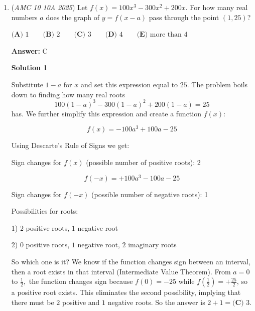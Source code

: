 \begin{enumerate}
 


	\item (\textit{AMC 10 10A 2025}) Let $f(x) = 100x^3 - 300x^2 + 200x$. For how many real numbers $a$ does the graph of $y = f(x - a)$ pass through the point $(1, 25)$?


 $\textbf{(A) }1 \qquad\textbf{(B) }2 \qquad\textbf{(C) }3 \qquad\textbf{(D) }4 \qquad\textbf{(E) }\text{more than }4$

 \textbf{Answer: }C



\textbf{Solution 1}

Substitute $1 - a$ for $x$ and set this expression equal to $25.$ The problem boils down to finding how many real roots  
 \[100(1-a)^3 - 300(1-a)^2 + 200(1-a) = 25\] has. We further simplify this expression and create a function $f(x):$

 \[f(x) = -100a^3 + 100a - 25\] 

 Using Descarte's Rule of Signs we get: 

 Sign changes for $f(x)$ (possible number of positive roots): 2 

 
 \[f(-x) = +100a^3 - 100a - 25\] 

 Sign changes for $f(-x)$ (possible number of negative roots): 1 

 
Possibilities for roots: 

 1) $2$ positive roots, $1$ negative root

 2) $0$ positive roots, $1$ negative root, $2$ imaginary roots

 
So which one is it? We know if the function changes sign between an interval, then a root exists in that interval (Intermediate Value Theorem). From $a = 0$ to $\frac{1}{2},$ the function changes sign because $f(0) = -25$ while $f(\frac{1}{2}) = +\frac{25}{2}$, so a positive root exists. This eliminates the second possibility, implying that there must be $2$ positive and $1$ negative roots. So the answer is $2 + 1 = \boxed{\textbf{(C) } 3}.$ 


\end{enumerate}
